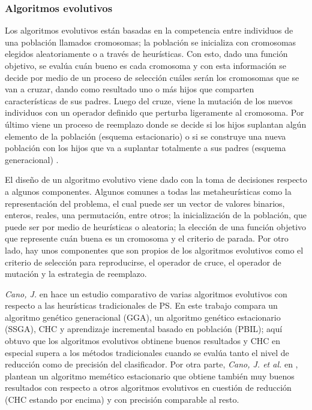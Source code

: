 \subsubsection{Algoritmos evolutivos}

Los algoritmos evolutivos están basadas en la competencia entre individuos de una población llamados cromosomas; la población se inicializa con cromosomas elegidos aleatoriamente o a través de heurísticas. Con esto, dado una función objetivo, se evalúa cuán bueno es cada cromosoma y con esta información se decide por medio de un proceso de selección cuáles serán los cromosomas que se van a cruzar, dando como resultado uno o más hijos que comparten características de sus padres. Luego del cruze, viene la mutación de los nuevos individuos con un operador definido que perturba ligeramente al cromosoma. Por último viene un proceso de reemplazo donde se decide si los hijos suplantan algún elemento de la población (esquema estacionario) o si se construye una nueva población con los hijos que va a suplantar totalmente a sus padres (esquema generacional) \cite{talbi2009metaheuristics}. 

El diseño de un algoritmo evolutivo viene dado con la toma de decisiones respecto a algunos componentes. Algunos comunes a todas las metaheurísticas como la representación del problema, el cual puede ser un vector de valores binarios, enteros, reales, una permutación, entre otros; la inicialización de la población, que puede ser por medio de heurísticas o aleatoria; la elección de una función objetivo que represente cuán buena es un cromosoma y el criterio de parada. Por otro lado, hay unos componentes que son propios de los algoritmos evolutivos como el criterio de selección para reproducirse, el operador de cruce, el operador de mutación y la estrategia de reemplazo.

\emph{Cano, J.} en \cite{de2004reduccion} hace un estudio comparativo de varias algoritmos evolutivos con respecto a las heurísticas tradicionales de PS. En este trabajo compara un algoritmo genético generacional (GGA), un algoritmo genético estacionario (SSGA), CHC y aprendizaje incremental basado en población (PBIL); aquí obtuvo que los algoritmos evolutivos obtinene buenos resultados y CHC en especial supera a los métodos tradicionales cuando se evalúa tanto el nivel de reducción como de precisión del clasificador. Por otra parte, \emph{Cano, J. et al.} en \cite{garcia2008memetic}, plantean un algoritmo memético estacionario que obtiene también muy buenos resultados con respecto a otros algoritmos evolutivos en cuestión de reducción (CHC estando por encima) y con precisión comparable al resto. 

